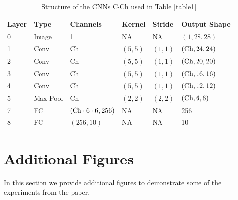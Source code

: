 \begin{table}[pt]
\centering
\caption{Structure of the CNNs C-Ch used in Table \ref{table1}}
\label{tab:CNN}
\begin{tabular}{llllll}
\toprule
     Layer & Type & Channels & Kernel & Stride & Output Shape \\
\midrule
     0 & Image & 1 & NA & NA & $(1, 28, 28)$ \\
     1 & Conv & Ch & $(5,5)$& $(1,1)$& $(\textnormal{Ch}, 24, 24)$\\
     2 & Conv & Ch & $(5,5)$& $(1,1)$& $(\textnormal{Ch}, 20, 20)$\\
     3 & Conv & Ch & $(5,5)$& $(1,1)$& $(\textnormal{Ch}, 16, 16)$\\
     4 & Conv & Ch & $(5,5)$& $(1,1)$& $(\textnormal{Ch}, 12, 12)$\\
     5 & Max Pool & Ch & $(2, 2)$ & $(2, 2)$& $(\textnormal{Ch}, 6, 6)$ \\
     7 & FC & $(\textnormal{Ch}\cdot 6 \cdot 6, 256)$ & NA & NA & 256 \\
     8 & FC & $(256, 10)$ & NA & NA & 10 \\
     \bottomrule
\end{tabular}
\end{table}
 

\section{Additional Figures}
In this section we provide additional figures to demonstrate some of the experiments from the paper.


